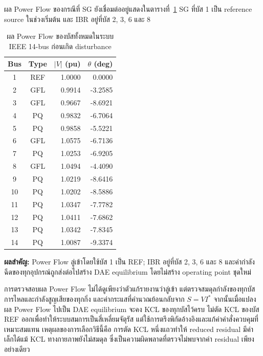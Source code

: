 \documentclass[12pt,a4paper]{article}
\newcommand{\tableheader}{\rowcolor{tablehead}}
\newcommand{\resultbox}[1]{\par\noindent\colorbox{academicgray}{\parbox{\dimexpr\textwidth-2\fboxsep\relax}{\textbf{ผลสำคัญ:} #1}}\par}
\begin{document}
ผล Power Flow ของกรณีที่ SG ยังเชื่อมต่ออยู่แสดงในตารางที่~\ref{tab:pf_key} SG ที่บัส 1 เป็น reference source ในช่วงเริ่มต้น และ IBR อยู่ที่บัส 2, 3, 6 และ 8
\begin{table}[H]
\centering
\caption{ผล Power Flow ของบัสทั้งหมดในระบบ IEEE 14-bus ก่อนเกิด disturbance}
\label{tab:pf_key}
\begin{tabular}{@{}c c r r@{}}
\toprule
\tableheader Bus & Type & $|V|$ (pu) & $\theta$ (deg) \\
\midrule
1  & REF & 1.0000 &  0.0000 \\
2  & GFL & 0.9914 & -3.2585 \\
3  & GFL & 0.9667 & -8.6921 \\
4  & PQ  & 0.9832 & -6.7064 \\
5  & PQ  & 0.9858 & -5.5221 \\
6  & GFL & 1.0575 & -6.7136 \\
7  & PQ  & 1.0253 & -6.9205 \\
8  & GFL & 1.0494 & -4.4090 \\
9  & PQ  & 1.0219 & -8.6416 \\
10 & PQ  & 1.0202 & -8.5886 \\
11 & PQ  & 1.0347 & -7.7782 \\
12 & PQ  & 1.0411 & -7.6862 \\
13 & PQ  & 1.0342 & -7.8345 \\
14 & PQ  & 1.0087 & -9.3374 \\
\bottomrule
\end{tabular}
\end{table}
\resultbox{Power Flow ลู่เข้าโดยใช้บัส 1 เป็น REF; IBR อยู่ที่บัส 2, 3, 6 และ 8 และค่ากำลังฉีดของทุกอุปกรณ์ถูกส่งต่อไปสร้าง DAE equilibrium โดยไม่สร้าง operating point ชุดใหม่}
การตรวจสอบผล Power Flow ไม่ได้ดูเพียงว่าตัวแก้รายงานว่าลู่เข้า แต่ตรวจสมดุลกำลังของทุกบัส การไหลและกำลังสูญเสียของทุกกิ่ง และค่ากระแสที่คำนวณย้อนกลับจาก $S=VI^{*}$ จากนั้นเมื่อแปลงผล Power Flow ไปเป็น DAE equilibrium จะคง KCL ของทุกบัสไว้ครบ ไม่ตัด KCL ของบัส REF ออกเพื่อทำให้ระบบสมการเป็นสี่เหลี่ยมจัตุรัส แต่ใช้การตรึงพิกัดอ้างอิงและแก้ค่าคำสั่งควบคุมที่เหมาะสมแทน เหตุผลของการเลือกวิธีนี้คือ การตัด KCL หนึ่งแถวทำให้ reduced residual มีค่าเล็กได้แม้ KCL ทางกายภาพยังไม่สมดุล ซึ่งเป็นความผิดพลาดที่ตรวจไม่พบจากค่า residual เพียงอย่างเดียว
\end{document}
